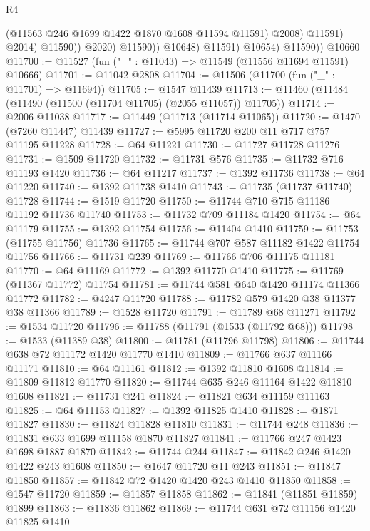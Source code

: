 \begin{lexlean}{R4}
\begin{coremodule}
                              (@11563 @246 @1699 @1422 @1870 @1608 @11594 @11591)
                              @2008)
                            @11591)
                          @2014)
                        @11590))
                    @2020)
                  @11590))
              @10648)
            @11591)
          @10654)
        @11590))
    @10660
@11700 := @11527 (fun ("_" : @11043) => @11549 (@11556 @11694 @11591) @10666)
@11701 := @11042 @2808
@11704 := @11506 (@11700 (fun ("_" : @11701) => @11694))
@11705 := @1547 @11439
@11713 := @11460 (@11484 (@11490 (@11500 (@11704 @11705) (@2055 @11057)) @11705))
@11714 := @2006 @11038
@11717 := @11449 (@11713 (@11714 @11065))
@11720 := @1470 (@7260 @11447) @11439
@11727 := @5995 @11720 @200 @11 @717 @757 @11195 @11228
@11728 := @64 @11221
@11730 := @11727 @11728 @11276
@11731 := @1509 @11720
@11732 := @11731 @576
@11735 := @11732 @716 @11193 @1420
@11736 := @64 @11217
@11737 := @1392 @11736
@11738 := @64 @11220
@11740 := @1392 @11738 @1410
@11743 := @11735 (@11737 @11740) @11728
@11744 := @1519 @11720
@11750 := @11744 @710 @715 @11186 @11192 @11736 @11740
@11753 := @11732 @709 @11184 @1420
@11754 := @64 @11179
@11755 := @1392 @11754
@11756 := @11404 @1410
@11759 := @11753 (@11755 @11756) @11736
@11765 := @11744 @707 @587 @11182 @1422 @11754 @11756
@11766 := @11731 @239
@11769 := @11766 @706 @11175 @11181
@11770 := @64 @11169
@11772 := @1392 @11770 @1410
@11775 := @11769 (@11367 @11772) @11754
@11781 := @11744 @581 @640 @1420 @11174 @11366 @11772
@11782 := @4247 @11720
@11788 := @11782 @579 @1420 @38 @11377 @38 @11366
@11789 := @1528 @11720
@11791 := @11789 @68 @11271
@11792 := @1534 @11720
@11796 := @11788 (@11791 (@1533 (@11792 @68)))
@11798 := @1533 (@11389 @38)
@11800 := @11781 (@11796 @11798)
@11806 := @11744 @638 @72 @11172 @1420 @11770 @1410
@11809 := @11766 @637 @11166 @11171
@11810 := @64 @11161
@11812 := @1392 @11810 @1608
@11814 := @11809 @11812 @11770
@11820 := @11744 @635 @246 @11164 @1422 @11810 @1608
@11821 := @11731 @241
@11824 := @11821 @634 @11159 @11163
@11825 := @64 @11153
@11827 := @1392 @11825 @1410
@11828 := @1871 @11827
@11830 := @11824 @11828 @11810
@11831 := @11744 @248
@11836 := @11831 @633 @1699 @11158 @1870 @11827
@11841 := @11766 @247 @1423 @1698 @1887 @1870
@11842 := @11744 @244
@11847 := @11842 @246 @1420 @1422 @243 @1608
@11850 := @1647 @11720 @11 @243
@11851 := @11847 @11850
@11857 := @11842 @72 @1420 @1420 @243 @1410 @11850
@11858 := @1547 @11720
@11859 := @11857 @11858
@11862 := @11841 (@11851 @11859) @1899
@11863 := @11836 @11862
@11869 := @11744 @631 @72 @11156 @1420 @11825 @1410

\end{coremodule}
\end{lexlean}
